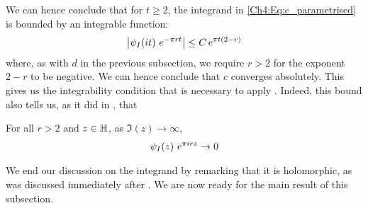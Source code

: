 We can hence conclude that for $t \geq 2$, the integrand in \eqref{Ch4:Eq:c_parametrised} is bounded by an integrable function:
\begin{align*}
    \left\lvert \psi_I\!\left( it \right) \, e^{- \pi r t} \right\rvert \leq C \, e^{\pi t \left( 2 - r \right)}
\end{align*}
where, as with $d$ in the previous subsection, we require $r > 2$ for the exponent $2 - r$ to be negative. We can hence conclude that $c$ converges absolutely. This gives us the integrability condition that is necessary to apply . Indeed, this bound also tells us, as it did in , that
\begin{boxlemma}
    For all $r > 2$ and $z \in \mathbb{H}$, as $\Im(z) \to \infty$,
    \begin{align*}
        \psi_I\!\left( z \right) \, e^{\pi i r z} \to 0
    \end{align*}
\end{boxlemma}

We end our discussion on the integrand by remarking that it is holomorphic, as was discussed immediately after . We are now ready for the main result of this subsection.

